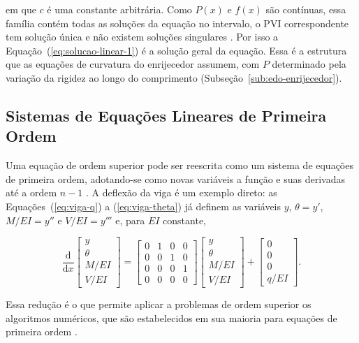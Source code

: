\documentclass[arial,centeredequations,english,brazilian,oneside,section=TITLE]{ifes8}
\begin{document}
em que $c$ é uma constante arbitrária. Como $P(x)$ e $f(x)$ são contínuas, essa família
contém todas as soluções da equação no intervalo, o PVI correspondente tem solução única
e não existem soluções singulares \cite{Zill2001v1}. Por isso a
Equação~(\ref{eq:solucao-linear-1}) é a solução geral da equação. Essa é a estrutura que
as equações de curvatura do enrijecedor assumem, com $P$ determinado pela variação da
rigidez ao longo do comprimento (Subseção~\ref{sub:edo-enrijecedor}).
 
\subsection{Sistemas de Equações Lineares de Primeira Ordem}
\label{sub:sistemas-lineares}
 
Uma equação de ordem superior pode ser reescrita como um sistema de equações de primeira
ordem, adotando-se como novas variáveis a função e suas derivadas até a ordem $n - 1$
\cite{Zill2001v2}. A deflexão da viga é um exemplo direto: as
Equações~(\ref{eq:viga-q}) a (\ref{eq:viga-theta}) já definem as variáveis $y$,
$\theta = y'$, $M/EI = y''$ e $V/EI = y'''$ e, para $EI$ constante,

\begin{equation}
  \label{eq:viga-sistema}
  \frac{\mathrm{d}}{\mathrm{d}x}
  \begin{bmatrix} y \\ \theta \\ M/EI \\ V/EI \end{bmatrix}
  =
  \begin{bmatrix}
    0 & 1 & 0 & 0 \\
    0 & 0 & 1 & 0 \\
    0 & 0 & 0 & 1 \\
    0 & 0 & 0 & 0
  \end{bmatrix}
  \begin{bmatrix} y \\ \theta \\ M/EI \\ V/EI \end{bmatrix}
  +
  \begin{bmatrix} 0 \\ 0 \\ 0 \\ q/EI \end{bmatrix}.
\end{equation}

Essa redução é o que permite aplicar a problemas de ordem superior os algoritmos
numéricos, que são estabelecidos em sua maioria para equações de primeira ordem
\cite{Zill2001v2}.
 
\end{document}
